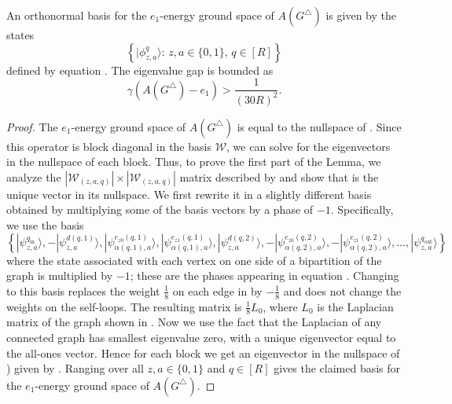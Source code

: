 \documentclass[../thesis-main/thesis-main]{subfiles}
\begin{document}
\begin{lemma}
\label{lem:A(G_triangle)}
An orthonormal basis for the $e_{1}$-energy ground space of $A(G^{\triangle})$ is given by the states
\[
\left\{ |\phi_{z,a}^{q}\rangle:\, z,a\in\{0,1\},\, q\in[R]\right\} 
\]
defined by equation . The eigenvalue gap is bounded as 
\begin{equation}
  \gamma(A(G^{\triangle})-e_{1}) > \frac{1}{(30R)^{2}}.
\label{eq:G^triangle_lower_bnd}
\end{equation}
\end{lemma}

\begin{proof}
The $e_1$-energy ground space of $A(G^{\triangle})$ is equal to the nullspace of . Since this operator is block diagonal in the basis $\mathcal{W}$, we can solve for the eigenvectors in the nullspace of each block. Thus, to prove the first part of the Lemma, we analyze the $|\mathcal{W}_{(z,a,q)}|\times|\mathcal{W}_{(z,a,q)}|$ matrix described by  and show that  is the unique vector in its nullspace. We first rewrite it in a slightly different basis obtained by multiplying some of the basis vectors by a phase of $-1$. Specifically, we use the basis
\[
\left\{
   |\psi_{z,a}^{q_{\mathrm{in}}}\rangle,
  -|\psi_{z,a}^{d(q,1)}\rangle,
   |\psi_{\alpha(q,1),a}^{e_{z0}(q,1)}\rangle,
   |\psi_{\alpha(q,1),a}^{e_{z1}(q,1)}\rangle,
   |\psi_{z,a}^{d(q,2)}\rangle,
  -|\psi_{\alpha(q,2),a}^{e_{z0}(q,2)}\rangle,
  -|\psi_{\alpha(q,2),a}^{e_{z1}(q,2)}\rangle,
   \ldots,
   |\psi_{z,a}^{q_{\mathrm{out}}}\rangle
\right\} 
\]
where the state associated with each vertex on one side of a bipartition of the graph is multiplied by $-1$; these are the phases appearing in equation . Changing to this basis replaces the weight $\frac{1}{8}$ on each edge in  by $-\frac{1}{8}$ and does not change the weights on the self-loops. The resulting matrix is $\frac{1}{8}L_{0}$, where $L_{0}$ is the Laplacian matrix of the graph shown in . Now we use the fact that the Laplacian of any connected graph has smallest eigenvalue zero, with a unique eigenvector equal to the all-ones vector. Hence for each block we get an eigenvector in the nullspace of ) given by . Ranging over all $z,a\in\{0,1\}$ and $q\in[R]$ gives the claimed basis for the $e_1$-energy ground space of $A(G^{\triangle})$.


\end{proof}
\end{document}
